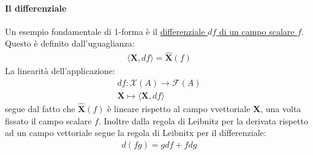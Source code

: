 \documentclass[10pt,a4paper]{book}
\begin{document}
\paragraph{Il differenziale} Un esempio fondamentale di 1-forma è il \underline{differenziale $df$ di un campo scalare $f$}.\\
Questo è definito dall'uguaglianza:
\begin{align*}
    \langle \mathbf{X},df\rangle = \hat{\mathbf{X}}(f)
\end{align*}
La linearità dell'applicazione:
\begin{align*}
    df\colon \mathcal{X}(A)\to \mathcal{F}(A)\\
    \mathbf{X}\mapsto \langle \mathbf{X},df\rangle 
\end{align*}
segue dal fatto che $\hat{\mathbf{X}}(f)$ è lineare rispetto al campo vvettoriale $\mathbf{X}$, una volta fissato il campo scalare $f$. Inoltre dalla regola di Leibnitz per la derivata rispetto ad un campo vettoriale segue la regola di Leibnitx per il differenziale:
\begin{align*}
    d(fg)=gdf+fdg
\end{align*}
\end{document}
